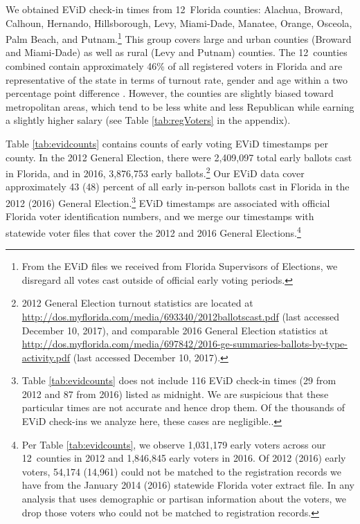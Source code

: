 \documentclass[12pt,titlepage]{article}
\newcommand{\numcounties}{12}
\begin{document}
We obtained EViD check-in times from \numcounties\ Florida counties:
Alachua, Broward, Calhoun, Hernando, Hillsborough, Levy, Miami-Dade,
Manatee, Orange, Osceola, Palm Beach, and Putnam.\footnote{From the
  EViD files we received from Florida Supervisors of Elections, we
  disregard all votes cast outside of official early voting periods.}
This group covers large and urban counties (Broward and Miami-Dade) as
well as rural (Levy and Putnam) counties. The \numcounties\ counties
combined contain approximately 46\% of all registered voters in
Florida and are representative of the state in terms of turnout rate,
gender and age within a two percentage point difference .  However,
the counties are slightly biased toward metropolitan areas, which tend
to be less white and less Republican while earning a slightly higher
salary (see Table \ref{tab:regVoters} in the appendix).

Table \ref{tab:evidcounts} contains counts of early voting EViD
timestamps per county. In the 2012 General Election, there were
2,409,097 total early ballots cast in Florida, and in 2016, 3,876,753
early ballots.\footnote{2012 General Election turnout statistics are
  located at
  \url{http://dos.myflorida.com/media/693340/2012ballotscast.pdf}
  (last accessed December 10, 2017), and comparable 2016 General
  Election statistics at
  \url{http://dos.myflorida.com/media/697842/2016-ge-summaries-ballots-by-type-activity.pdf}
  (last accessed December 10, 2017).} Our EViD data cover
approximately 43 (48) percent of all early in-person ballots cast in
Florida in the 2012 (2016) General Election.\footnote{Table
  \ref{tab:evidcounts} does not include 116 EViD check-in times (29
  from 2012 and 87 from 2016) listed as midnight.  We are suspicious
  that these particular times are not accurate and hence drop them. Of
  the thousands of EViD check-ins we analyze here, these cases are
  negligible.\label{fn:midnight}.}  EViD timestamps are associated
with official Florida voter identification numbers, and we merge our
timestamps with statewide voter files that cover the 2012 and 2016
General Elections.\footnote{Per Table \ref{tab:evidcounts}, we observe
  1,031,179 early voters across our \numcounties\ counties in 2012 and
  1,846,845 early voters in 2016. Of 2012 (2016) early voters, 54,174
  (14,961) could not be matched to the registration records we have
  from the January 2014 (2016) statewide Florida voter extract file.
  In any analysis that uses demographic or partisan information about
  the voters, we drop those voters who could not be matched to
  registration records.}
\end{document}
